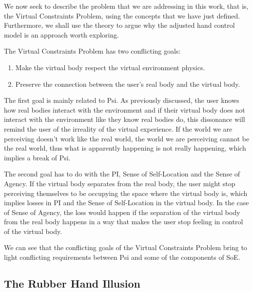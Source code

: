 We now seek to describe the problem that we are addressing in this work, that is, the Virtual Constraints Problem, using the concepts that we have just defined. Furthermore, we shall use the theory to argue why the adjusted hand control model is an approach worth exploring.

The Virtual Constraints Problem has two conflicting goals:

\begin{enumerate}
\item Make the virtual body respect the virtual environment physics.
\item Preserve the connection between the user's real body and the virtual body.
\end{enumerate}

The first goal is mainly related to Psi. As previously discussed, the user knows how real bodies interact with the environment and if their virtual body does not interact with the environment like they know real bodies do, this dissonance will remind the user of the irreality of the virtual experience. If the world we are perceiving doesn't work like the real world, the world we are perceiving cannot be the real world, thus what is apparently happening is not really happening, which implies a break of Psi.

The second goal has to do with the PI, Sense of Self-Location and the Sense of Agency. If the virtual body separates from the real body, the user might stop perceiving themselves to be occupying the space where the virtual body is, which implies losses in PI and the Sense of Self-Location in the virtual body. In the case of Sense of Agency, the loss would happen if the separation of the virtual body from the real body happens in a way that makes the user stop feeling in control of the virtual body.

We can see that the conflicting goals of the Virtual Constraints Problem bring to light conflicting requirements between Psi and some of the components of SoE.


\subsection{The Rubber Hand Illusion}
\label{subsec:rubberHandIllusion}

